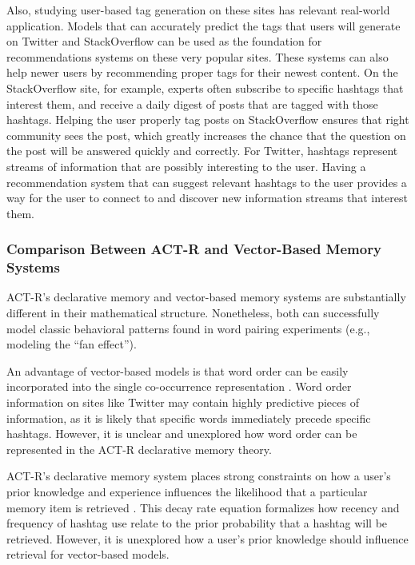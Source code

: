 \documentclass[man,floatsintext,donotrepeattitle]{apa6}
\begin{document}
Also, studying user-based tag generation on these sites has relevant real-world application.
Models that can accurately predict the tags that users will generate on Twitter and StackOverflow can be used as the foundation for recommendations systems on these very popular sites.
These systems can also help newer users by recommending proper tags for their newest content.
On the StackOverflow site, for example, experts often subscribe to specific hashtags that interest them, and receive a daily digest of posts that are tagged with those hashtags.
Helping the user properly tag posts on StackOverflow ensures that right community sees the post, which greatly increases the chance that the question on the post will be answered quickly and correctly.
For Twitter, hashtags represent streams of information that are possibly interesting to the user.
Having a recommendation system that can suggest relevant hashtags to the user provides a way for the user to connect to and discover new information streams that interest them.

\subsubsection{Comparison Between ACT-R and Vector-Based Memory Systems}

ACT-R's declarative memory and vector-based memory systems are substantially different in their mathematical structure.
Nonetheless, both can successfully model classic behavioral patterns found in word pairing experiments (e.g., \cite{Rutledge2008} modeling the ``fan effect'').

An advantage of vector-based models is that word order can be easily incorporated into the single co-occurrence representation \parencite{Jones2007}.
Word order information on sites like Twitter may contain highly predictive pieces of information, as it is likely that specific words immediately precede specific hashtags.
However, it is unclear and unexplored how word order can be represented in the ACT-R declarative memory theory.

ACT-R's declarative memory system places strong constraints on how a user's prior knowledge and experience influences the likelihood that a particular memory item is retrieved \parencite{Anderson2007}.
This decay rate equation formalizes how recency and frequency of hashtag use relate to the prior probability that a hashtag will be retrieved.
However, it is unexplored how a user's prior knowledge should influence retrieval for vector-based models.
\end{document}
